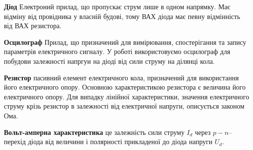 

\qquad \textbf{Діод}  Електроний прилад, що пропускає струм лише в одном напрямку. Має відміну від провідника у власній будові, тому ВАХ діода має певну відмінність від ВАХ резистора. \par
\textbf{Осцилограф} Прилад, що призначений для вимірювання, спостерігання та запису параметрів електричного сигналу. У роботі використовуємо осцилограф для побудови залежності напргуи на діоді від сили струму на ділянці кола. \par
\textbf{Резистор}  пасивний елемент електричного кола, призначений для використання його електричного опору. Основною характеристикою резистора є величина його електричного опору. Для випадку лінійної характеристики, значення електричного струму крізь резистор в залежності від електричної напруги, описується законом Ома. \par
\textbf{Вольт-амперна характеристика}  це залежність сили струму $I_d$ через $p-n$–перехід діода від величини і полярності прикладеної до діода напруги $U_d$.
